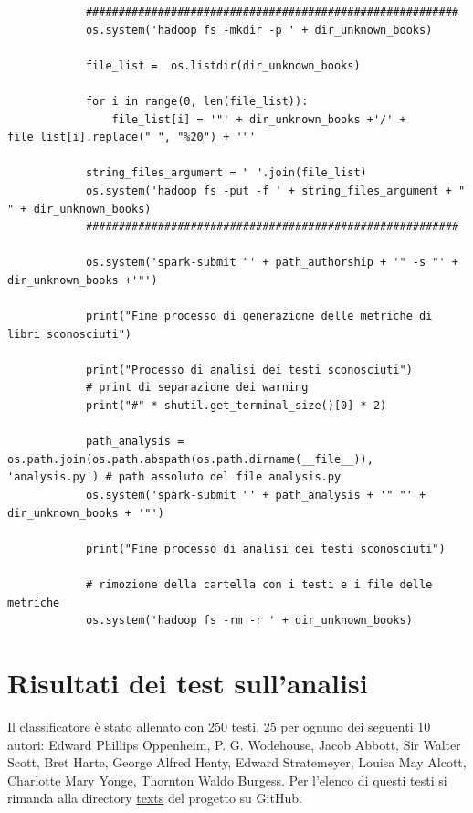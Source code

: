\documentclass[titlepage]{article}
\begin{document}
\begin{verbatim}
            #########################################################
            os.system('hadoop fs -mkdir -p ' + dir_unknown_books)
            
            file_list =  os.listdir(dir_unknown_books)
            
            for i in range(0, len(file_list)):
                file_list[i] = '"' + dir_unknown_books +'/' + file_list[i].replace(" ", "%20") + '"'
            
            string_files_argument = " ".join(file_list)         
            os.system('hadoop fs -put -f ' + string_files_argument + " " + dir_unknown_books)
            #########################################################
            
            os.system('spark-submit "' + path_authorship + '" -s "' + dir_unknown_books +'"')
            
            print("Fine processo di generazione delle metriche di libri sconosciuti")                

            print("Processo di analisi dei testi sconosciuti")
            # print di separazione dei warning
            print("#" * shutil.get_terminal_size()[0] * 2)
            
            path_analysis = os.path.join(os.path.abspath(os.path.dirname(__file__)), 'analysis.py') # path assoluto del file analysis.py
            os.system('spark-submit "' + path_analysis + '" "' + dir_unknown_books + '"')

            print("Fine processo di analisi dei testi sconosciuti")

            # rimozione della cartella con i testi e i file delle metriche
            os.system('hadoop fs -rm -r ' + dir_unknown_books)
\end{verbatim}


\newpage
\section{Risultati dei test sull'analisi}
\label{sec:4}
Il classificatore è stato allenato con 250 testi, 25 per ognuno dei seguenti 10 autori: Edward Phillips Oppenheim, P. G. Wodehouse, Jacob Abbott, Sir Walter Scott, Bret Harte, George Alfred Henty, Edward Stratemeyer, Louisa May Alcott, Charlotte Mary Yonge, Thornton Waldo Burgess. Per l'elenco di questi testi si rimanda alla directory \href{https://github.com/zampierida98/authorship/tree/main/texts}{texts} del progetto su GitHub.
\end{document}
